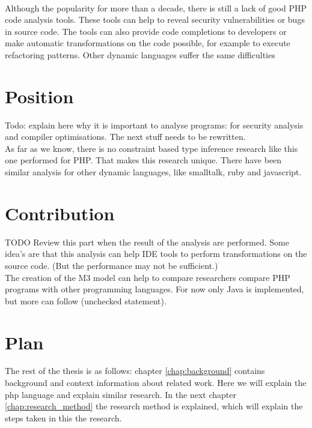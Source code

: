 \documentclass[../main.tex]{subfiles}
\begin{document}
        \paragraph{}%
        Although the popularity for more than a decade, there is still a lack of good PHP code analysis tools.
        These tools can help to reveal security vulnerabilities or bugs in source code.
        The tools can also provide code completions to developers or make automatic transformations on the code possible, for example to execute refactoring patterns.
        Other dynamic languages suffer the same difficulties
        
    \section{Position} %
        Todo: explain here why it is important to analyse programs: for security analysis and compiler optimisations. The next stuff needs to be rewritten. \\
        As far as we know, there is no constraint based type inference research like this one performed for PHP.
        That makes this research unique.
        There have been similar analysis for other dynamic languages, like smalltalk, ruby and javascript.
       
    \section{Contribution} %
        TODO Review this part when the result of the analysis are performed.
        Some idea's are that this analysis can help IDE tools to perform transformations on the source code.
        (But the performance may not be sufficient.)
        \\
        The creation of the M3 model can help to compare researchers compare PHP programs with other programming languages. For now only Java is implemented, but more can follow (unchecked statement).
    
    \section{Plan} %
        The rest of the thesis is as follows:
        chapter \ref{chap:background} contains background and context information about related work.
        Here we will explain the php language and explain similar research.
        In the next chapter \ref{chap:research_method} the research method is explained, which will explain the steps taken in this the research.
        
\end{document}
